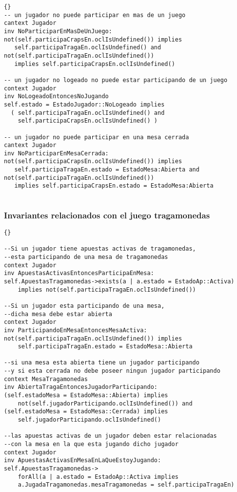 \begin{framed}
\begin{lstlisting}[frame=trbl]{}
-- un jugador no puede participar en mas de un juego
cantext Jugador
inv NoParticiparEnMasDeUnJuego:
not(self.participaCrapsEn.oclIsUndefined()) implies 
   self.participaTragaEn.oclIsUndefined() and
not(self.participaTragaEn.oclIsUndefined()) 
   implies self.participaCrapsEn.oclIsUndefined()

-- un jugador no logeado no puede estar participando de un juego
context Jugador
inv NoLogeadoEntoncesNoJugando
self.estado = EstadoJugador::NoLogeado implies 
  ( self.participaTragaEn.oclIsUndefined() and 
    self.participaCrapsEn.oclIsUndefined() )

-- un jugador no puede participar en una mesa cerrada
cantext Jugador
inv NoParticiparEnMesaCerrada:
not(self.participaCrapsEn.oclIsUndefined()) implies 
   self.participaTragaEn.estado = EstadoMesa:Abierta and
not(self.participaTragaEn.oclIsUndefined()) 
   implies self.participaCrapsEn.estado = EstadoMesa:Abierta
   
\end{lstlisting}


\subsubsection{Invariantes relacionados con el juego tragamonedas}
\lstset{language=ocl}
\lstset{commentstyle=\textit}
\begin{lstlisting}[frame=trbl]{}

--Si un jugador tiene apuestas activas de tragamonedas,
--esta participando de una mesa de tragamonedas
context Jugador
inv ApuestasActivasEntoncesParticipaEnMesa:
self.ApuestasTragamonedas->exists(a | a.estado = EstadoAp::Activa)
    implies not(self.participaTragaEn.oclIsUndefined())

--Si un jugador esta participando de una mesa, 
--dicha mesa debe estar abierta
context Jugador
inv ParticipandoEnMesaEntoncesMesaActiva:
not(self.participaTragaEn.oclIsUndefined()) implies
    self.participaTragaEn.estado = EstadoMesa::Abierta

--si una mesa esta abierta tiene un jugador participando 
--y si esta cerrada no debe poseer ningun jugador participando
context MesaTragamonedas
inv AbiertaTragaEntoncesJugadorParticipando:
(self.estadoMesa = EstadoMesa::Abierta) implies 
    not(self.jugadorParticipando.oclIsUndefined()) and
(self.estadoMesa = EstadoMesa::Cerrada) implies 
    self.jugadorParticipando.oclIsUndefined()

--las apuestas activas de un jugador deben estar relacionadas 
--con la mesa en la que esta jugando dicho jugador
context Jugador
inv ApuestasActivasEnMesaEnLaQueEstoyJugando:
self.ApuestasTragamonedas->
    forAll(a | a.estado = EstadoAp::Activa implies 
    a.JugadaTragamonedas.mesaTragamonedas = self.participaTragaEn)


\end{lstlisting}
\end{framed}
